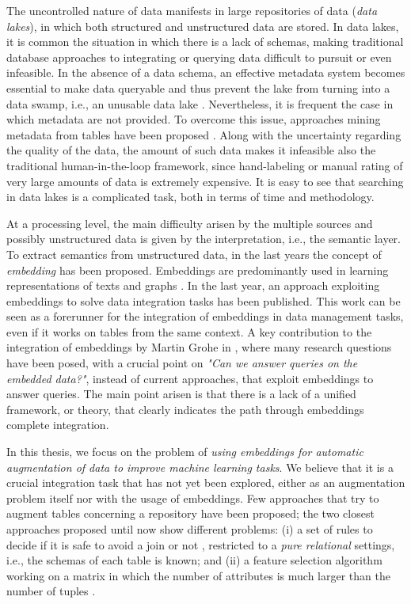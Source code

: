 The uncontrolled nature of data manifests in large repositories of data (\textit{data lakes}), in which both structured and unstructured data are stored. In data lakes, it is common the situation in which there is a lack of schemas, making traditional database approaches to integrating or querying data difficult to pursuit or even infeasible. In the absence of a data schema, an effective metadata system becomes essential to make data queryable and thus prevent the lake from turning into a data swamp, i.e., an unusable data lake \cite{walker2015personal,hai2016constance}. Nevertheless, it is frequent the case in which metadata are not provided. To overcome this issue, approaches mining metadata from tables have been proposed \cite{arocena2015ibench,suriarachchi2016crossing}.
Along with the uncertainty regarding the quality of the data, the amount of such data makes it infeasible also the traditional human-in-the-loop framework, since hand-labeling or manual rating of very large amounts of data is extremely expensive. It is easy to see that searching in data lakes is a complicated task, both in terms of time and methodology. 

At a processing level, the main difficulty arisen by the multiple sources and possibly unstructured data is given by the interpretation, i.e., the semantic layer. To extract semantics from unstructured data, in the last years the concept of \textit{embedding} has been proposed. Embeddings are predominantly used in learning representations of texts \cite{mikolov2013efficient} and graphs \cite{nickel2017poincare}. In the last year, an approach exploiting embeddings to solve data integration tasks \cite{cappuzzo2020creating} has been published. This work can be seen as a forerunner for the integration of embeddings in data management tasks, even if it works on tables from the same context. A key contribution to the integration of embeddings by Martin Grohe in \cite{grohe2020word2vec}, where many research questions have been posed, with a crucial point on \textit{"Can we answer queries on the embedded data?"}, instead of current approaches, that exploit embeddings to answer queries. The main point arisen is that there is a lack of a unified framework, or theory, that clearly indicates the path through embeddings complete integration. 


In this thesis, we focus on the problem of \textit{using embeddings for automatic augmentation of data to improve machine learning tasks}. We believe that it is a crucial integration task that has not yet been explored, either as an augmentation problem itself nor with the usage of embeddings. Few approaches that try to augment tables concerning a repository have been proposed; the two closest approaches proposed until now show different problems: (i) a set of rules to decide if it is safe to avoid a join or not \cite{kumar2016join}, restricted to a \textit{pure relational} settings, i.e., the schemas of each table is known; and (ii) a feature selection algorithm working on a matrix in which the number of attributes is much larger than the number of tuples \cite{chepurko2020arda}. 

